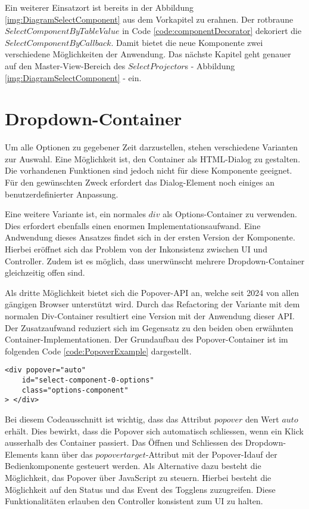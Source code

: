 Ein weiterer Einsatzort ist bereits in der Abbildung \ref{img:DiagramSelectComponent} aus dem Vorkapitel zu erahnen.
Der rotbraune $SelectComponentByTableValue$ in Code \ref{code:componentDecorator} dekoriert die $SelectComponentByCallback$.
Damit bietet die neue Komponente zwei verschiedene Möglichkeiten der Anwendung.
Das nächste Kapitel geht genauer auf den Master-View-Bereich des $SelectProjector$s - Abbildung \ref{img:DiagramSelectComponent} - ein.


\section{Dropdown-Container}

Um alle Optionen zu gegebener Zeit darzustellen, stehen verschiedene Varianten zur Auswahl.
Eine Möglichkeit ist, den Container als HTML-Dialog zu gestalten.
Die vorhandenen Funktionen sind jedoch nicht für diese Komponente geeignet.
Für den gewünschten Zweck erfordert das Dialog-Element noch einiges an benutzerdefinierter Anpassung.

Eine weitere Variante ist, ein normales $div$ als Options-Container zu verwenden.
Dies erfordert ebenfalls einen enormen Implementationsaufwand.
Eine Andwendung dieses Ansatzes findet sich in der ersten Version der Komponente.
Hierbei eröffnet sich das Problem von der Inkonsistenz zwischen UI und Controller.
Zudem ist es möglich, dass unerwünscht mehrere Dropdown-Container gleichzeitig offen sind.

Als dritte Möglichkeit bietet sich die Popover-API an, welche seit 2024 von allen gängigen Browser unterstützt wird.
Durch das Refactoring der Variante mit dem normalen Div-Container resultiert eine Version mit der Anwendung dieser API.
Der Zusatzaufwand reduziert sich im Gegensatz zu den beiden oben erwähnten Container-Implementationen.
Der Grundaufbau des Popover-Container ist im folgenden Code \ref{code:PopoverExample} dargestellt.

\begin{lstlisting}[style = htmlcssjs, caption = Popover-Container Beispiel, label = code:PopoverExample]
<div popover="auto"
    id="select-component-0-options" 
    class="options-component" 
> </div>
\end{lstlisting}

Bei diesem Codeausschnitt ist wichtig, dass das Attribut $popover$ den Wert $auto$ erhält.
Dies bewirkt, dass die Popover sich automatisch schliessen, wenn ein Klick ausserhalb des Container passiert.
Das Öffnen und Schliessen des Dropdown-Elements kann über das $popovertarget$-Attribut mit der Popover-Id\footnotemark auf der Bedienkomponente gesteuert werden.
Als Alternative dazu besteht die Möglichkeit, das Popover über JavaScript zu steuern.
Hierbei besteht die Möglichkeit auf den Status und das Event des Togglens zuzugreifen.
Diese Funktionalitäten erlauben den Controller konsistent zum UI zu halten.



